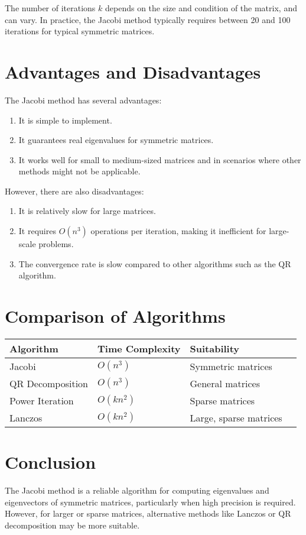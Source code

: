 \documentclass[journal]{IEEEtran}
\begin{document}
The number of iterations $k$ depends on the size and condition of the matrix, and can vary. In practice, the Jacobi method typically requires between 20 and 100 iterations for typical symmetric matrices.

\section{Advantages and Disadvantages}

The Jacobi method has several advantages:
\begin{enumerate}
    \item It is simple to implement.
    \item It guarantees real eigenvalues for symmetric matrices.
    \item It works well for small to medium-sized matrices and in scenarios where other methods might not be applicable.
\end{enumerate}

However, there are also disadvantages:
\begin{enumerate}
    \item It is relatively slow for large matrices.
    \item It requires $O(n^3)$ operations per iteration, making it inefficient for large-scale problems.
    \item The convergence rate is slow compared to other algorithms such as the QR algorithm.
\end{enumerate}


\section{Comparison of Algorithms}

\begin{tabular}{|l|l|l|l|}
\hline
\textbf{Algorithm} & \textbf{Time Complexity} & \textbf{Suitability}  \\ \hline
Jacobi & $O(n^3)$ & Symmetric matrices \\ \hline
QR Decomposition & $O(n^3)$ & General matrices \\ \hline
Power Iteration & $O(kn^2)$ & Sparse matrices \\ \hline
Lanczos & $O(kn^2)$ & Large, sparse matrices \\ \hline
\end{tabular}

\section*{\textbf{Conclusion}}

The Jacobi method is a reliable algorithm for computing eigenvalues and eigenvectors of symmetric matrices, particularly when high precision is required. However, for larger or sparse matrices, alternative methods like Lanczos or QR decomposition may be more suitable.
\end{document}
